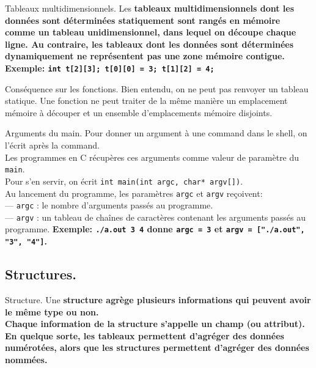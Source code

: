 \documentclass[french, 11pt]{article}
\begin{document}
\begin{defi}{Tableaux multidimensionnels.}{}
    Les \bf{tableaux multidimensionnels} dont les données sont déterminées statiquement sont rangés en mémoire comme un tableau unidimensionnel, dans lequel on découpe chaque ligne. Au contraire, les tableaux dont les données sont déterminées dynamiquement ne représentent pas une zone mémoire contigue.\n
    \bf{Exemple:} \texttt{int t[2][3]; t[0][0] = 3; t[1][2] = 4;}
\end{defi}

\begin{defi}{Conséquence sur les fonctions.}{}
    Bien entendu, on ne peut pas renvoyer un tableau statique. Une fonction ne peut traiter de la même manière un emplacement mémoire à découper et un ensemble d'emplacements mémoire disjoints.
\end{defi}

\begin{defi}{Arguments du main.}{}
    Pour donner un argument à une command dans le shell, on l'écrit après la command.\\
    Les programmes en C récupères ces arguments comme valeur de paramètre du \texttt{main}.\\
    Pour s'en servir, on écrit \texttt{int main(int argc, char* argv[])}.\\
    Au lancement du programme, les paramètres \texttt{argc} et \texttt{argv} reçoivent:\\
    --- \texttt{argc} : le nombre d'arguments passés au programme.\\
    --- \texttt{argv} : un tableau de chaînes de caractères contenant les arguments passés au programme.\n
    \bf{Exemple:} \texttt{./a.out 3 4} donne \texttt{argc = 3} et \texttt{argv = ["./a.out", "3", "4"]}.
\end{defi}

\subsection{Structures.}

\begin{defi}{Structure.}{}
    Une \bf{structure} agrège plusieurs informations qui peuvent avoir le même type ou non.\\
    Chaque information de la structure s'appelle un \bf{champ} (ou attribut).\\
    En quelque sorte, les tableaux permettent d'agréger des données numérotées, alors que les structures permettent d'agréger des données nommées.
\end{defi}
\end{document}
